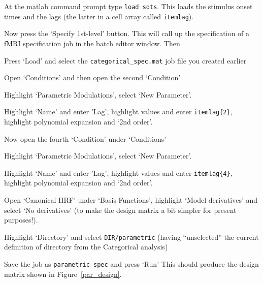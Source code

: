 \bi
\item{At the matlab command prompt type \verb!load sots!. This loads the stimulus onset times and the lags (the latter in a cell array called \verb!itemlag!).}
\ei

Now press the `Specify 1st-level' button. This will call up the specification of a fMRI specification job in the batch editor window. Then
\bi
\item{Press `Load' and select the \verb!categorical_spec.mat! job file you created earlier}
\item{Open `Conditions' and then open the second `Condition'}
\item{Highlight `Parametric Modulations', select `New Parameter'.}
\item{Highlight `Name' and enter 'Lag', highlight values and enter \verb!itemlag{2}!, highlight polynomial expansion and `2nd order'.}
\item{Now open the fourth `Condition' under `Conditions'}
\item{Highlight `Parametric Modulations', select `New Parameter'.}
\item{Highlight `Name' and enter 'Lag', highlight values and enter \verb!itemlag{4}!, highlight polynomial expansion and `2nd order'.}
\item{Open `Canonical HRF' under `Basis Functions', highlight `Model derivatives' and select 
`No derivatives' (to make the design matrix a bit simpler for present purposes!).}
\item{Highlight `Directory' and select \verb!DIR/parametric! (having ``unselected'' the current definition of directory from the Categorical analysis)}
\item{Save the job as \verb!parametric_spec! and press `Run'}
\ei
This should produce the design matrix shown in Figure~\ref{par_design}.
